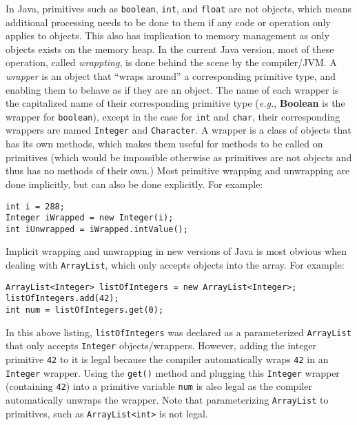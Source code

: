 \documentclass{tufte-handout}
\begin{document}
    In Java, primitives such as \texttt{boolean}, \texttt{int}, and \texttt{float} are not objects, which means additional processing needs to be done to them if any code or operation only applies to objects. This also has implication to memory management as only objects exists on the memory heap. In the current Java version, most of these operation, called \emph{wrappting}, is done behind the scene by the compiler/JVM. A \emph{wrapper} is an object that ``wraps around'' a corresponding primitive type, and enabling them to behave as if they are an object. The name of each wrapper is the capitalized name of their corresponding primitive type (\textit{e.g.}, \texttt{}{\textbf{Boolean}} is the wrapper for \texttt{boolean}), except in the case for \texttt{int} and \texttt{char}, their corresponding wrappers are named \texttt{Integer} and \texttt{Character}. A wrapper is a class of objects that has its own methods, which makes them useful for methods to be called on primitives (which would be impossible otherwise as primitives are not objects and thus has no methods of their own.) Most primitive wrapping and unwrapping are done implicitly, but can also be done explicitly. For example:

    \begin{lstlisting}
int i = 288;
Integer iWrapped = new Integer(i);
int iUnwrapped = iWrapped.intValue();
    \end{lstlisting}

    Implicit wrapping and unwrapping in new versions of Java is most obvious when dealing with \texttt{ArrayList}, which only accepts objects into the array. For example:

    \begin{lstlisting}
ArrayList<Integer> listOfIntegers = new ArrayList<Integer>;
listOfIntegers.add(42);
int num = listOfIntegers.get(0);
    \end{lstlisting}

    In this above listing, \texttt{listOfIntegers} was declared as a parameterized \texttt{ArrayList} that only accepts \texttt{Integer} objects/wrappers. However, adding the integer primitive \texttt{42} to it is legal because the compiler automatically wraps \texttt{42} in an \texttt{Integer} wrapper. Using the \texttt{get()} method and plugging this \texttt{Integer} wrapper (containing \texttt{42}) into a primitive variable \texttt{num} is also legal as the compiler automatically unwraps the wrapper. Note that parameterizing \texttt{ArrayList} to primitives, such as \texttt{ArrayList<int>} is not legal. 
\end{document}
